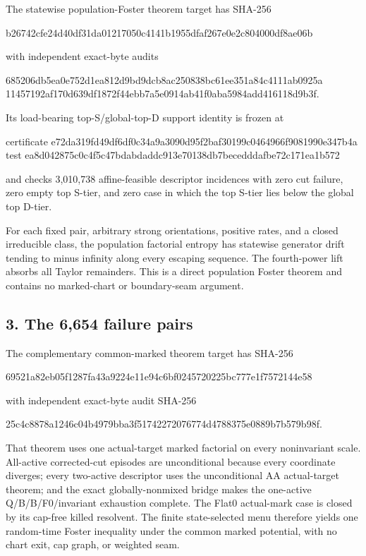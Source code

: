 The statewise population-Foster theorem target has SHA-256

\begin{CodeBlock}
b26742cfe24d40df31da01217050c4141b1955dfaf267e0e2c804000df8ae06b
\end{CodeBlock}

with independent exact-byte audits

\begin{CodeBlock}
685206db5ea0e752d1ea812d9bd9dcb8ac250838bc61ee351a84c4111ab0925a
11457192af170d639df1872f44ebb7a5e0914ab41f0aba5984add416118d9b3f.
\end{CodeBlock}

Its load-bearing top-S/global-top-D support identity is frozen at

\begin{CodeBlock}
certificate e72da319fd49df6df0c34a9a3090d95f2baf30199c0464966f9081990e347b4a
test        ea8d042875c0c4f5c47bdabdaddc913e70138db7becedddafbe72c171ea1b572
\end{CodeBlock}

and checks 3,010,738 affine-feasible descriptor incidences with zero cut
failure, zero empty top S-tier, and zero case in which the top S-tier
lies below the global top D-tier.

For each fixed pair, arbitrary strong orientations, positive rates, and
a closed irreducible class, the population factorial entropy has
statewise generator drift tending to minus infinity along every escaping
sequence. The fourth-power lift absorbs all Taylor remainders. This is a
direct population Foster theorem and contains no marked-chart or
boundary-seam argument.

\subsection{3. The 6,654 failure pairs}

The complementary common-marked theorem target has SHA-256

\begin{CodeBlock}
69521a82eb05f1287fa43a9224e11e94c6bf0245720225bc777e1f7572144e58
\end{CodeBlock}

with independent exact-byte audit SHA-256

\begin{CodeBlock}
25c4c8878a1246c04b4979bba3f51742272076774d4788375e0889b7b579b98f.
\end{CodeBlock}

That theorem uses one actual-target marked factorial on every
noninvariant scale. All-active corrected-cut episodes are unconditional
because every coordinate diverges; every two-active descriptor uses the
unconditional AA actual-target theorem; and the exact globally-nonmixed
bridge makes the one-active Q/B/B/F0/invariant exhaustion complete. The
Flat0 actual-mark case is closed by its cap-free killed resolvent. The
finite state-selected menu therefore yields one random-time Foster
inequality under the common marked potential, with no chart exit, cap
graph, or weighted seam.

